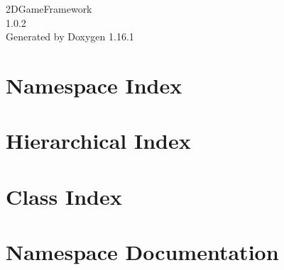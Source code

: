 \documentclass[twoside]{book}
\newcommand{\+}{\discretionary{\mbox{\scriptsize$\hookleftarrow$}}{}{}}
\newcommand{\clearemptydoublepage}{%
    \newpage{\pagestyle{empty}\cleardoublepage}%
  }
\begin{document}
  \raggedbottom
    \hypersetup{pageanchor=false,
                bookmarksnumbered=true,
                pdfencoding=unicode
               }
  \begin{titlepage}
  \vspace*{7cm}
  \begin{center}%
  {\Large 2\+DGame\+Framework}\\
  [1ex]\large 1.\+0.\+2 \\
  \vspace*{1cm}
  {\large Generated by Doxygen 1.16.1}\\
  \end{center}
  \end{titlepage}
  \clearemptydoublepage
  \tableofcontents
  \clearemptydoublepage
  \hypersetup{pageanchor=true}
\chapter{Namespace Index}

\chapter{Hierarchical Index}

\chapter{Class Index}

\chapter{Namespace Documentation}
















\end{document}
